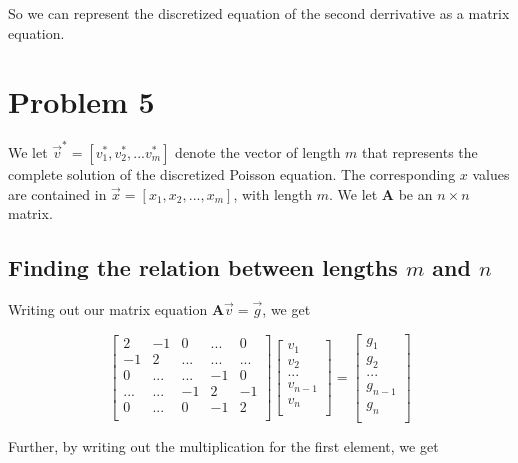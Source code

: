 \documentclass[english,notitlepage]{article}  %
\begin{document}
    So we can represent the discretized equation of the second derrivative as a matrix equation.

\section*{Problem 5}

  We let $\vec{v}^* = [v^*_1, v^*_2, ... v^*_m]$ denote the vector of length $m$ that represents the complete solution of the discretized Poisson equation. The corresponding $x$ values are contained in $\vec{x} = [x_1, x_2, ..., x_m]$, with length $m$. We let \textbf{A} be an $n \times n$ matrix.

  \subsection*{Finding the relation between lengths $m$ and $n$}

    Writing out our matrix equation $\boldsymbol{A} \vec{v} = \vec{g}$, we get

    \begin{equation}
      \begin{bmatrix}
          2 & -1 & 0 & ... & 0 \\
          -1 & 2 & ... & ... & ... \\
          0 & ... & ... & -1 & 0 \\
          ... & ... & -1 & 2 & -1 \\
          0 & ... & 0 & -1 & 2 \\
      \end{bmatrix} \begin{bmatrix}
          v_1 \\
          v_2 \\
          ... \\
          v_{n-1} \\
          v_n \\
      \end{bmatrix} =
      \begin{bmatrix}
          g_1 \\
          g_2 \\
          ... \\
          g_{n-1} \\
          g_n \\
      \end{bmatrix}
    \end{equation}

    Further, by writing out the multiplication for the first element, we get
\end{document}
